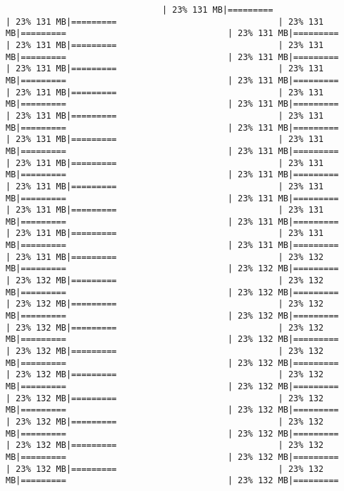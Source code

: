 \documentclass[
]{article}
\begin{document}
\begin{verbatim}
                               | 23% 131 MB|=========                                | 23% 131 MB|=========                                | 23% 131 MB|=========                                | 23% 131 MB|=========                                | 23% 131 MB|=========                                | 23% 131 MB|=========                                | 23% 131 MB|=========                                | 23% 131 MB|=========                                | 23% 131 MB|=========                                | 23% 131 MB|=========                                | 23% 131 MB|=========                                | 23% 131 MB|=========                                | 23% 131 MB|=========                                | 23% 131 MB|=========                                | 23% 131 MB|=========                                | 23% 131 MB|=========                                | 23% 131 MB|=========                                | 23% 131 MB|=========                                | 23% 131 MB|=========                                | 23% 131 MB|=========                                | 23% 131 MB|=========                                | 23% 131 MB|=========                                | 23% 131 MB|=========                                | 23% 131 MB|=========                                | 23% 131 MB|=========                                | 23% 131 MB|=========                                | 23% 131 MB|=========                                | 23% 131 MB|=========                                | 23% 131 MB|=========                                | 23% 131 MB|=========                                | 23% 131 MB|=========                                | 23% 131 MB|=========                                | 23% 132 MB|=========                                | 23% 132 MB|=========                                | 23% 132 MB|=========                                | 23% 132 MB|=========                                | 23% 132 MB|=========                                | 23% 132 MB|=========                                | 23% 132 MB|=========                                | 23% 132 MB|=========                                | 23% 132 MB|=========                                | 23% 132 MB|=========                                | 23% 132 MB|=========                                | 23% 132 MB|=========                                | 23% 132 MB|=========                                | 23% 132 MB|=========                                | 23% 132 MB|=========                                | 23% 132 MB|=========                                | 23% 132 MB|=========                                | 23% 132 MB|=========                                | 23% 132 MB|=========                                | 23% 132 MB|=========                                | 23% 132 MB|=========                                | 23% 132 MB|=========                                | 23% 132 MB|=========                                | 23% 132 MB|=========                                | 23% 132 MB|=========                                | 23% 132 MB|=========                                | 23% 132 MB|=========                                | 23% 132 MB|=========                                | 23% 132 MB|=========                          
\end{verbatim}
\end{document}

